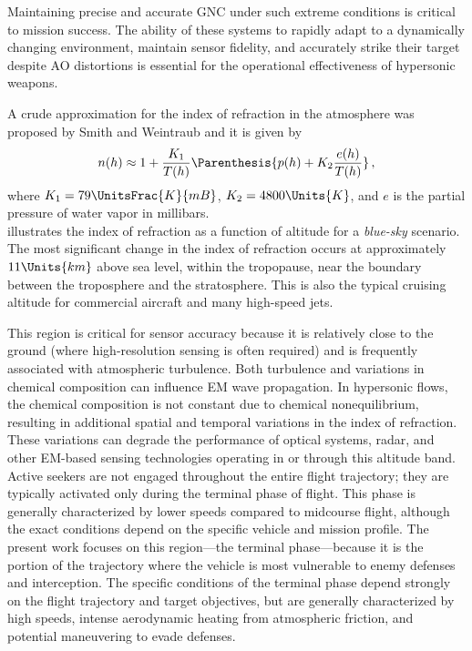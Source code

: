         Maintaining precise and accurate \gls{GNC} under such extreme
        conditions is critical to mission success. The ability of these systems
        to rapidly adapt to a dynamically changing environment, maintain sensor
        fidelity, and accurately strike their target despite \gls{AO} 
        distortions is essential for the operational effectiveness of
        hypersonic weapons.

        A crude approximation for the index of refraction in the atmosphere was proposed by Smith and Weintraub \cite{Smith1953}
        and it is given by 
        \begin{equation}\label{eq:crudeIndexApproximation}
            n(h) \approx 1 + \frac{K_1}{T(h)} \Parenthesis{ p(h) +
            K_2\frac{e(h)}{T(h)}}\,,
        \end{equation}
        where $K_1 =
        79\UnitsFrac{K}{mB}$, $K_2=4800\Units{K}$, and $e$ is the partial pressure
        of water vapor in millibars. \\

         illustrates the index of refraction
        as a function of altitude for a \textit{blue-sky} scenario. The most
        significant change in the index of refraction occurs at approximately
        $11\Units{km}$ above sea level, within the tropopause, near the
        boundary between the troposphere and the stratosphere. This is also the
        typical cruising altitude for commercial aircraft and many high-speed
        jets. 

        This region is critical for sensor accuracy because it is relatively
        close to the ground (where high-resolution sensing is often required)
        and is frequently associated with atmospheric turbulence. Both
        turbulence and variations in chemical composition can influence
        \gls{EM} wave propagation. In hypersonic flows, the chemical
        composition is not constant due to chemical nonequilibrium, resulting
        in additional spatial and temporal variations in the index of
        refraction. These variations can degrade the performance of optical
        systems, radar, and other \gls{EM}-based sensing technologies operating
        in or through this altitude band. \\

Active seekers are not engaged throughout the entire flight trajectory;
they are typically activated only during the terminal phase of flight.
This phase is generally characterized by lower speeds compared to midcourse
flight, although the exact conditions depend on the specific vehicle and
mission profile. The present work focuses on this region—the terminal
phase—because it is the portion of the trajectory where the vehicle is most
vulnerable to enemy defenses and interception. The specific conditions of the
terminal phase depend strongly on the flight trajectory and target objectives,
but are generally characterized by high speeds, intense aerodynamic heating
from atmospheric friction, and potential maneuvering to evade defenses. \\


